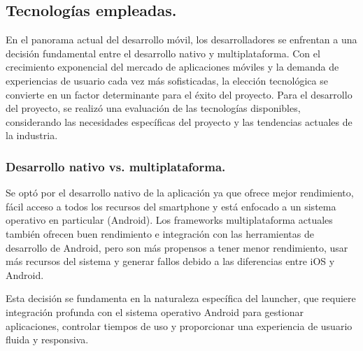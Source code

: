 \subsection{Tecnologías empleadas.}

En el panorama actual del desarrollo móvil, los desarrolladores se enfrentan a una decisión fundamental entre el desarrollo nativo y multiplataforma. Con el crecimiento exponencial del mercado de aplicaciones móviles y la demanda de experiencias de usuario cada vez más sofisticadas, la elección tecnológica se convierte en un factor determinante para el éxito del proyecto. Para el desarrollo del proyecto, se realizó una evaluación de las tecnologías disponibles, considerando las necesidades específicas del proyecto y las tendencias actuales de la industria.

\subsubsection{Desarrollo nativo vs. multiplataforma.}

Se optó por el desarrollo nativo de la aplicación ya que ofrece mejor rendimiento, fácil acceso a todos los recursos del smartphone y está enfocado a un sistema operativo en particular (Android). Los frameworks multiplataforma actuales también ofrecen buen rendimiento e integración con las herramientas de desarrollo de Android, pero son más propensos a tener menor rendimiento, usar más recursos del sistema y generar fallos debido a las diferencias entre iOS y Android.

Esta decisión se fundamenta en la naturaleza específica del launcher, que requiere integración profunda con el sistema operativo Android para gestionar aplicaciones, controlar tiempos de uso y proporcionar una experiencia de usuario fluida y responsiva.


